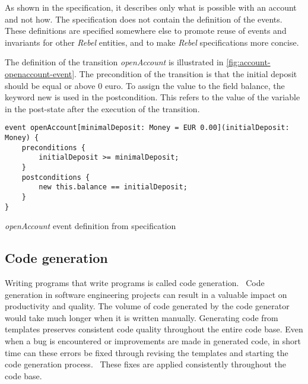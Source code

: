 As shown in the specification, it describes only what is possible with an account and not how. The specification does not contain the definition of the events. These definitions are specified somewhere else to promote reuse of events and invariants for other \textit{Rebel} entities, and to make \textit{Rebel} specifications more concise.~\cite[p.~4]{stoel_storm_vinju_bosman_2016}

The definition of the transition \textit{openAccount} is illustrated in \autoref{fig:account-openaccount-event}. The precondition of the transition is that the initial deposit should be equal or above 0 euro. To assign the value to the field balance, the keyword new is used in the postcondition. This refers to the value of the variable in the post-state after the execution of the transition.~\cite[p.~4]{stoel_storm_vinju_bosman_2016}

\begin{sourcecode}[h!]
\begin{lstlisting}[]
event openAccount[minimalDeposit: Money = EUR 0.00](initialDeposit: Money) {
	preconditions {
		initialDeposit >= minimalDeposit;
	}
	postconditions {
		new this.balance == initialDeposit;
	}
}
\end{lstlisting}
\caption{\textit{openAccount} event definition from specification}\label{fig:account-openaccount-event}
\end{sourcecode}
\FloatBarrier

\subsection{Code generation}\label{sec:ch2-codegen}

Writing programs that write programs is called code generation.~\cite[p.~3]{herrington2003code} Code generation in software engineering projects can result in a valuable impact on productivity and quality. The volume of code generated by the code generator would take much longer when it is written manually. Generating code from templates preserves consistent code quality throughout the entire code base. Even when a bug is encountered or improvements are made in generated code, in short time can these errors be fixed through revising the templates and starting the code generation process.~\cite[p.~15-17]{herrington2003code} These fixes are applied consistently throughout the code base.

